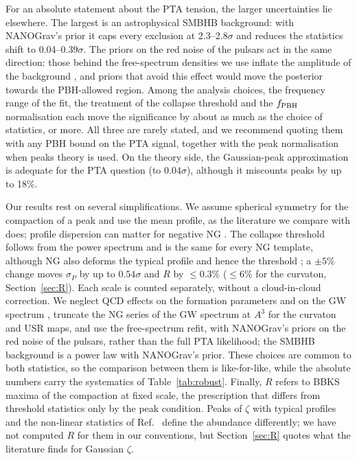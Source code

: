 \documentclass{article}
\newcommand{\fpbh}{f_{\rm PBH}}
\begin{document}
For an absolute statement about the PTA tension, the larger uncertainties lie elsewhere. The
largest is an astrophysical SMBHB background: with NANOGrav's prior it caps every exclusion at
2.3--2.8$\sigma$ and reduces the statistics shift to 0.04--0.39$\sigma$. The priors on the red
noise of the pulsars act in the same direction: those behind the free-spectrum densities we use
inflate the amplitude of the background \cite{DZA26}, and priors that avoid this effect would move
the posterior towards the PBH-allowed region. Among the analysis choices, the frequency range of
the fit, the treatment of the collapse threshold and the $\fpbh$ normalisation each move the
significance by about as much as the choice of statistics, or more.
All three are rarely stated, and we recommend quoting them with any PBH bound on the PTA signal,
together with the peak normalisation when peaks theory is used. On the theory side, the
Gaussian-peak approximation is adequate for the PTA question (to $0.04\sigma$), although it
miscounts peaks by up to 18\%.

Our results rest on several simplifications. We assume spherical symmetry for the compaction of a
peak \cite{Young22} and use the mean profile, as the literature we compare with does; profile
dispersion can matter for negative NG \cite{Escriva26}. The collapse threshold follows from the
power spectrum and is the same for every NG template, although NG also deforms the typical profile
and hence the threshold \cite{KMR19,ETYY22}; a $\pm5\%$ change moves $\sigma_P$ by up to
$0.54\sigma$ and $R$ by $\le0.3\%$ ($\le6\%$ for the curvaton, Section~\ref{sec:R}). Each scale is
counted separately, without a cloud-in-cloud correction. We neglect QCD effects on the formation
parameters \cite{MJY23,FMPU22} and on the GW spectrum \cite{ATU21,BDF23}, truncate the NG series of
the GW spectrum at $A^3$ for the curvaton and USR maps, and use the free-spectrum refit, with
NANOGrav's priors on the red noise of the pulsars, rather than the full PTA likelihood; the SMBHB
background is a power law with NANOGrav's prior. These choices are common to both statistics, so the comparison between them is like-for-like, while the
absolute numbers carry the systematics of Table~\ref{tab:robust}. Finally, $R$ refers to BBKS
maxima of the compaction at fixed scale, the prescription that differs from threshold statistics
only by the peak condition. Peaks of $\zeta$ with typical profiles \cite{Yoo18,Yoo20,Kitajima}
and the non-linear statistics of Ref.~\cite{GS20} define the abundance differently; we have not
computed $R$ for them in our conventions, but Section~\ref{sec:R} quotes what the literature
finds for Gaussian $\zeta$.
\end{document}
